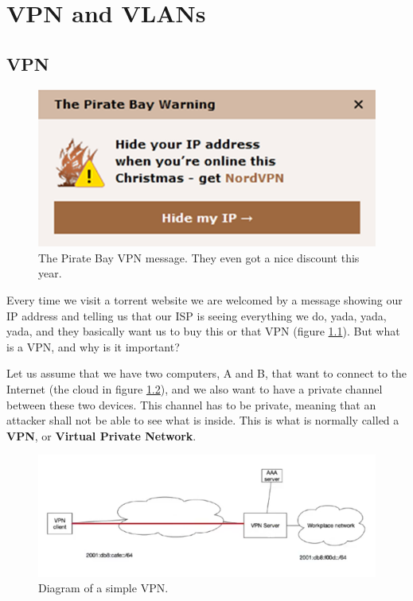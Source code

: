 \chapter{VPN and VLANs}
\label{ch:vpn_vlan}


\section{VPN}
\begin{figure}[h]
    \centering
    \includegraphics[scale=0.5]{img/tpb_vpn.png}
    \decoRule
    \caption{The Pirate Bay VPN message. They even got a nice discount this year.}
    \label{fig:tpb_vpn}
\end{figure}

Every time we visit a torrent website we are welcomed by a message showing our IP address and telling us that our ISP is seeing everything we do, yada, yada, yada, and they basically want us to buy this or that VPN (figure \ref{fig:tpb_vpn}). But what is a VPN, and why is it important?

Let us assume that we have two computers, A and B, that want to connect to the Internet (the cloud in figure \ref{fig:vpn}), and we also want to have a private channel between these two devices. This channel has to be private, meaning that an attacker shall not be able to see what is inside. This is what is normally called a \textbf{VPN}, or \textbf{Virtual Private Network}.

\begin{figure}[h]
    \centering
    \includegraphics[scale=0.7]{img/vpn.png}
    \decoRule
    \caption{Diagram of a simple VPN.}
    \label{fig:vpn}
\end{figure}
 
